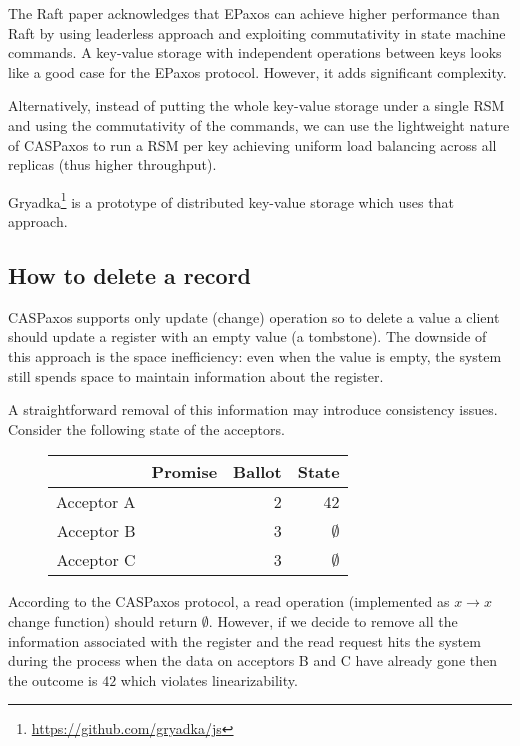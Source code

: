 \documentclass[12pt]{article}
\theoremstyle{definition}
\begin{document}
The Raft paper\cite{raft} acknowledges that EPaxos\cite{epaxos} can achieve higher performance than Raft by using leaderless approach and exploiting commutativity in state machine commands. A key-value storage with independent operations between keys looks like a good case for the EPaxos protocol. However, it adds significant complexity.

Alternatively, instead of putting the whole key-value storage under a single RSM and using the commutativity of the commands, we can use the lightweight nature of CASPaxos to run a RSM per key achieving uniform load balancing across all replicas (thus higher throughput).

Gryadka\footnote{\href{https://github.com/gryadka/js}{https://github.com/gryadka/js}} is a prototype of distributed key-value storage which uses that approach.

\subsection{How to delete a record}

CASPaxos supports only update (change) operation so to delete a value a client should update a register with an empty value (a tombstone). The downside of this approach is the space inefficiency: even when the value is empty, the system still spends space to maintain information about the register.

A straightforward removal of this information may introduce consistency issues. Consider the following state of the acceptors.

\begin{figure}[!h]
  \centering
  \begin{tabular}{ r|r|r|r }
    & Promise & Ballot & State \\ \hline
    Acceptor A && 2 & 42 \\
    Acceptor B && 3 & $\emptyset$ \\
    Acceptor C && 3 & $\emptyset$ \\
  \end{tabular}
\end{figure}

According to the CASPaxos protocol, a read operation (implemented as $x \to x$ change function) should return $\emptyset$. However, if we decide to remove all the information associated with the register and the read request hits the system during the process when the data on acceptors B and C have already gone then the outcome is $42$ which violates linearizability.
\end{document}
